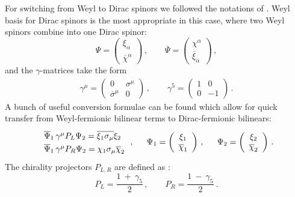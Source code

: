 \documentclass[12pt]{revtex4}
\begin{document}
For switching from Weyl to Dirac spinors we followed the notations of 
\cite{Martin:1997ns}.
Weyl basis for Dirac spinors is the most appropriate in this case,
where two Weyl spinors combine into one Dirac spinor:
\[
\Psi = 
\left (
\begin{array}{c}
  \xi_\alpha \\
\overline{\chi}^{\dot\alpha}
\end{array}
\right )\,,
\qquad
\overline{\Psi} = 
\left (
\begin{array}{c}
  \chi^\alpha \\
\overline{\xi}_{\dot\alpha}
\end{array}
\right )\,,
\]
and the $ \gamma $-matrices take the form
\begin{eqnarray*}
\gamma^\mu = 
\left ( 
\begin{array}{cc}
0                    &    \sigma^\mu \\
                     \overline{\sigma}^\mu   &         0    
\end{array}
\right )\,,
\qquad
\gamma^5 = 
\left ( 
\begin{array}{cc}
1      &         0  \\
                        0      &        -1    
\end{array}
\right )\,.
\end{eqnarray*}
A bunch of useful conversion formulae can be found
\cite{Martin:1997ns}
which allow for quick transfer from Weyl-fermionic
bilinear terms to Dirac-fermionic bilinears:
\begin{equation}
\begin{array}{ccc}
\renewcommand{\arraystretch}{1.3}
\begin{array}{l}
  \overline{\Psi}_1\, \gamma^\mu P_L \Psi_2 =
    \overline{\xi_1 \sigma_\mu} \xi_2     \\
  \overline{\Psi}_1\, \gamma^\mu P_R \Psi_2 =
    \chi_1 \sigma_\mu \overline{\chi}_2
\end{array}\,,   
\renewcommand{\arraystretch}{1.0}
&
~~
\Psi_1 = \left (
         \begin{array}{c}
   \xi_1 \\
   \overline{\chi}_1
 \end{array}
 \right )
\,,
&
~~
\Psi_2 = \left (
         \begin{array}{c}
   \xi_2 \\
   \overline{\chi}_2
 \end{array}
 \right )\,.
\end{array}
\end{equation}
The chirality projectors $ P_{L,R} $ are defined as
\cite{Martin:1997ns}:
\[
P_L = \frac{ 1 ~+~ \gamma_5 }
                        { 2 }\,,
\qquad
P_R = \frac{ 1 ~-~ \gamma_5 }
                        { 2 }~.
\]
\end{document}
